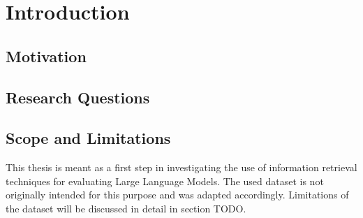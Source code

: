 \chapter{Introduction}\label{structure}



\section{Motivation}\label{sec:motivation}

\section{Research Questions}\label{sec:research-question}


\section{Scope and Limitations}\label{sec:scope-and-limitations}
This thesis is meant as a first step in investigating the use of information retrieval techniques for evaluating Large Language Models.
The used dataset is not originally intended for this purpose and was adapted accordingly.
Limitations of the dataset will be discussed in detail in section TODO.


